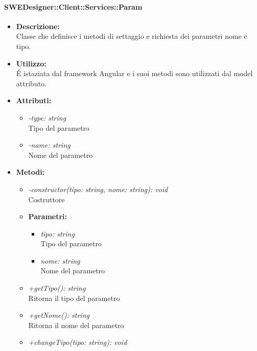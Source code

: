 			\paragraph{SWEDesigner::Client::Services::Param}
				\begin{itemize}
          			\item \textbf{Descrizione:}\\
          			Classe che definisce i metodi di settaggio e richiesta dei parametri nome e tipo.
          			\item \textbf{Utilizzo:}\\
          			É istaziata dal framework Angular e i suoi metodi sono utilizzati dal model attributo.
          			\item \textbf{Attributi:}\\
          			\begin{itemize}
          				\item \emph{-type: string}\\
            			Tipo del parametro
            			\item \emph{-name: string}\\
            			Nome del parametro
          			\end{itemize}
          			\item \textbf{Metodi:}\\
          			\begin{itemize}
          				\item \emph{-constructor(tipo: string, nome: string): void}\\
            			Costruttore
            			\item \textbf{Parametri:}\\
            				\begin{itemize}
            					\item \emph{tipo: string}\\
            					Tipo del parametro
            					\item \emph{nome: string}\\
            					Nome del parametro
            				\end{itemize}
            			\item \emph{+getTipo(): string}\\
            			Ritorna il tipo del parametro
            			\item \emph{+getNome(): string}\\
            			Ritorna il nome del parametro
            			\item \emph{+changeTipo(tipo: string): void}\\

\end{itemize}
\end{itemize}
